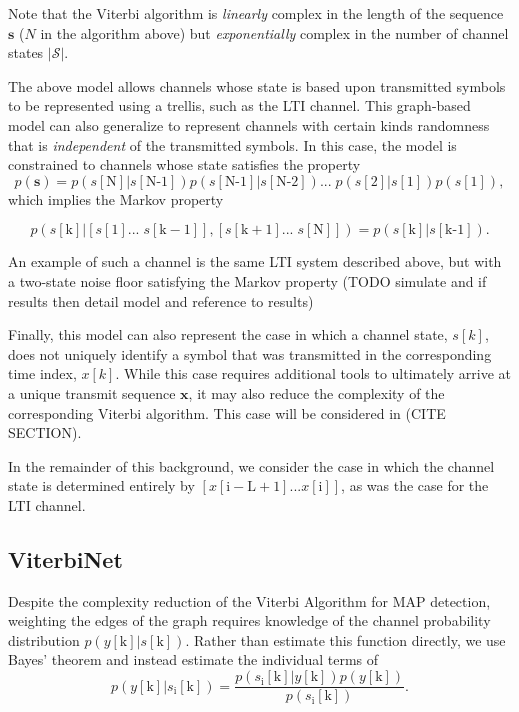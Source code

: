 Note that the Viterbi algorithm is \emph{linearly} complex in the length of the sequence $\mathbf{s}$ ($N$ in the algorithm above) but \emph{exponentially} complex in the number of channel states $|\mathcal{S}|$. 
\par
The above model allows channels whose state is based upon transmitted symbols to be represented using a trellis, such as the LTI channel. This graph-based model can also generalize to represent channels with certain kinds randomness that is \emph{independent} of the transmitted symbols. In this case, the model is constrained to channels whose state satisfies the property
\begin{equation*}
p(\mathbf{s}) = p(s[\text{N}]|s[\text{N-1}]) p(s[\text{N-1}]|s[\text{N-2}])... \;p(s[\text{2}]|s[\text{1}])p(s[\text{1}]),
\end{equation*}
which implies the Markov property

\begin{equation*}
p(s[\text{k}]|\left[s[\mathrm{1}]...\; s[\mathrm{k-1}]\right],\left[s[\mathrm{k+1}]... \;s[\mathrm{N}]\right]) = p(s[\text{k}]|s[\text{k-1}]).
\end{equation*}

An example of such a channel is the same LTI system described above, but with a two-state noise floor satisfying the Markov property (TODO simulate and if results then detail model and reference to results)
\par
Finally, this model can also represent the case in which a channel state, $s[k]$, does not uniquely identify a symbol that was transmitted in the corresponding time index, $x[k]$. While this case requires additional tools to ultimately arrive at a unique transmit sequence $\mathbf{x}$, it may also reduce the complexity of the corresponding Viterbi algorithm. This case will be considered in (CITE SECTION).
\par
In the remainder of this background, we consider the case in which the  channel state is determined entirely by $\left[x[\mathrm{i-L+1}]...x[\mathrm{i}]\right]$, as was the case for the LTI channel. 

\subsection{ViterbiNet}

Despite the complexity reduction of the Viterbi Algorithm for MAP detection, weighting the edges of the graph requires knowledge of the channel probability distribution $p(y[\mathrm{k}]|s[\mathrm{k}])$. Rather than estimate this function directly, we use Bayes' theorem and instead estimate the individual terms of
\begin{equation*}
p(y[\mathrm{k}]|s_{\text{i}}[\text{k}]) = 
\frac
{p(s_{\text{i}}[\text{k}]|y[\mathrm{k}])p(y[\mathrm{k}])}
{p(s_{\text{i}}[\text{k}])}.
\end{equation*}

